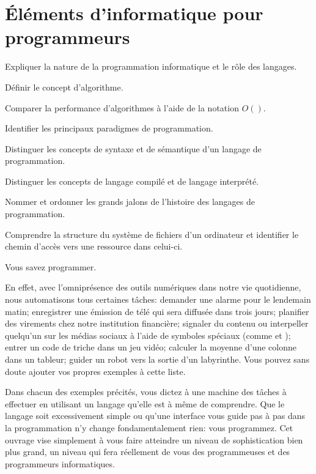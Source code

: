 
\chapter{Éléments d'informatique pour programmeurs}
\label{chap:informatique}

\begin{objectifs}
\item Expliquer la nature de la programmation informatique et le rôle
  des langages.
\item Définir le concept d'algorithme.
\item Comparer la performance d'algorithmes à l'aide de la notation
  $O()$.
\item Identifier les principaux paradigmes de programmation.
\item Distinguer les concepts de syntaxe et de sémantique d'un langage
  de programmation.
\item Distinguer les concepts de langage compilé et de langage
  interprété.
\item Nommer et ordonner les grands jalons de l'histoire des langages
  de programmation.
\item Comprendre la structure du système de fichiers d'un ordinateur
  et identifier le chemin d'accès vers une ressource dans celui-ci.
\end{objectifs}

Vous savez programmer.

En effet, avec l'omniprésence des outils numériques dans notre vie
quotidienne, nous automatisons tous certaines tâches:
demander une alarme pour le lendemain matin;
enregistrer une émission de télé qui sera diffusée dans trois jours;
planifier des virements chez notre institution
  financière;
signaler du contenu ou interpeller quelqu'un sur les médias sociaux
  à l'aide de symboles spéciaux (comme \code{\#} et );
entrer un code de triche dans un jeu vidéo;
calculer la moyenne d'une colonne dans un tableur;
guider un robot vers la sortie d'un labyrinthe.
Vous pouvez sans doute ajouter vos propres exemples à cette liste.

Dans chacun des exemples précités, vous dictez à une machine des
tâches à effectuer en utilisant un langage qu'elle est à même de
comprendre. Que le langage soit excessivement simple ou qu'une
interface vous guide pas à pas dans la programmation n'y change
fondamentalement rien: vous programmez. Cet ouvrage vise simplement à
vous faire atteindre un niveau de sophistication bien plus grand, un
niveau qui fera réellement de vous des programmeuses et des
programmeurs informatiques.



